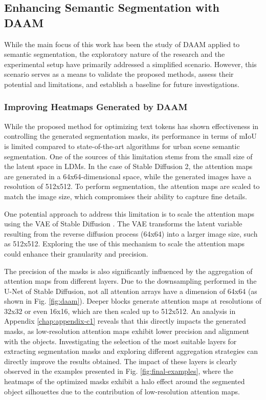 \subsection{Enhancing Semantic Segmentation with DAAM}
\label{sec:future-segmantic-segmentation}

While the main focus of this work has been the study of DAAM applied to semantic segmentation, the exploratory nature of the research and the experimental setup have primarily addressed a simplified scenario. However, this scenario serves as a means to validate the proposed methods, assess their potential and limitations, and establish a baseline for future investigations.

\subsubsection{Improving Heatmaps Generated by DAAM}
\label{sec:future-heatmaps}

While the proposed method for optimizing text tokens has shown effectiveness in controlling the generated segmentation masks, its performance in terms of mIoU is limited compared to state-of-the-art algorithms for urban scene semantic segmentation. One of the sources of this limitation stems from the small size of the latent space in LDMs. In the case of Stable Diffusion 2, the attention maps are generated in a 64x64-dimensional space, while the generated images have a resolution of 512x512. To perform segmentation, the attention maps are scaled to match the image size, which compromises their ability to capture fine details.

One potential approach to address this limitation is to scale the attention maps using the VAE of Stable Diffusion \cite{rombach2022high}. The VAE transforms the latent variable resulting from the reverse diffusion process (64x64) into a larger image size, such as 512x512. Exploring the use of this mechanism to scale the attention maps could enhance their granularity and precision.

The precision of the masks is also significantly influenced by the aggregation of attention maps from different layers. Due to the downsampling performed in the U-Net of Stable Diffusion, not all attention arrays have a dimension of 64x64 (as shown in Fig. \ref{fig:daam}). Deeper blocks generate attention maps at resolutions of 32x32 or even 16x16, which are then scaled up to 512x512. An analysis in Appendix \ref{chap:appendix-c1} reveals that this directly impacts the generated masks, as low-resolution attention maps exhibit lower precision and alignment with the objects. Investigating the selection of the most suitable layers for extracting segmentation masks and exploring different aggregation strategies can directly improve the results obtained. The impact of these layers is clearly observed in the examples presented in Fig. \ref{fig:final-examples}, where the heatmaps of the optimized masks exhibit a halo effect around the segmented object silhouettes due to the contribution of low-resolution attention maps.

